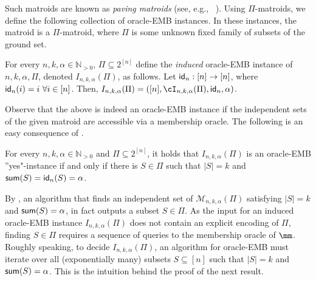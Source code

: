 Such matroids are known as {\em paving matroids} (see, e.g.,~ \cite{Ox2006,PvdP14}).
Using $\Pi$-matroids, we define the following collection of oracle-EMB instances. In these instances, the matroid is a $\Pi$-matroid, 
where $\Pi$ is some unknown fixed family of subsets of the ground set. 
\begin{definition}
	\label{def:EMBpi}
	For every $n,k,\alpha \in \mathbb{N}_{>0}$, $\Pi \subseteq 2^{[n]}$ define the 
	{\em induced} oracle-\textnormal{EMB} instance of $n,k,\alpha,\Pi$, denoted $I_{n,k,\alpha}(\Pi)$, as follows. Let
	$\textnormal{\textsf{id}}_n: [n] \rightarrow [n]$, where $\textnormal{\textsf{id}}_n(i) = i~\forall i \in [n]$. Then, 
	$I_{n,k,\alpha}(\Pi) = ([n],\cI_{n,k,\alpha}(\Pi),\textnormal{\textsf{id}}_n,\alpha)$.
\end{definition}

Observe that the above is indeed an oracle-EMB instance if the independent sets of the given matroid are accessible via a membership oracle. The following is an easy consequence of .

\begin{observation}
	\label{obs:YesNo}
	For every $n,k,\alpha \in \mathbb{N}_{>0}$ and $\Pi \subseteq 2^{[n]}$, it holds that $I_{n,k,\alpha}(\Pi)$ is an \textnormal{oracle-EMB} ''yes"-instance if and only if there is $S \in \Pi$ such that $|S| = k$ and $\textnormal{\textsf{sum}}(S) = \textnormal{\textsf{id}}_n(S) = \alpha$. 
\end{observation}

By , an algorithm that finds an independent set of $\mathcal{M}_{n,k,\alpha}(\Pi)$ satisfying $|S| = k$ and $\textnormal{\textsf{sum}}(S) = \alpha$, %
in fact outputs a subset $S \in \Pi$. 
As the input for an induced oracle-EMB instance $I_{n,k,\alpha}(\Pi)$ does not contain an explicit encoding of $\Pi$, finding $S\in \Pi$ requires a sequence of queries to the membership oracle of $\mm$.  Roughly speaking, to decide $I_{n,k,\alpha}(\Pi)$, 
an algorithm for oracle-EMB must iterate over all (exponentially many) subsets $S \subseteq [n]$ such that $|S| = k$ and $\textnormal{\textsf{sum}}(S) = \alpha$. This is the intuition
behind the proof of the next result.  
